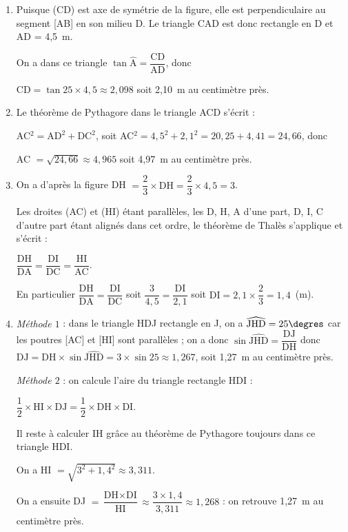 \begin{enumerate}
\item %
Puisque (CD) est axe de symétrie de la figure, elle est perpendiculaire au segment [AB] en son milieu D. Le triangle CAD est donc rectangle en D et AD = 4,5~m.

On a dans ce triangle $\tan \widehat{\text{A}} = \dfrac{\text{CD}}{\text{AD}}$, donc

$\text{CD} = \tan 25 \times 4,5 \approx 2,098$ soit 2,10~m au centimètre près.
\item %
Le théorème de Pythagore dans le triangle ACD s'écrit :

AC$^2 = \text{AD}^2 + \text{DC}^2$, soit AC$^2 = 4,5^2 + 2,1^2 = 20,25 + 4,41 = 24,66$, donc

AC $= \sqrt{24,66} \approx 4,965$ soit 4,97~m au centimètre près.
\item %

On a d'après la figure DH $ = \dfrac{2}{3} \times \text{DH} = \dfrac{2}{3} \times 4,5 = 3$.

Les droites (AC) et (HI) étant parallèles, les D, H, A d'une part, D, I, C d'autre part étant alignés dans cet ordre, le théorème de Thalès s'applique et s'écrit :

$\dfrac{\text{DH}}{\text{DA}}  = \dfrac{\text{DI}}{\text{DC}} = \dfrac{\text{HI}}{\text{AC}}$.

En particulier $\dfrac{\text{DH}}{\text{DA}}  = \dfrac{\text{DI}}{\text{DC}}$ soit $\dfrac{3}{4,5} = \dfrac{\text{DI}}{2,1}$ soit $\text{DI} = 2,1 \times \dfrac{2}{3} = 1,4$~(m).
\item %
\emph{Méthode $1$} : dans le triangle HDJ rectangle en J, on a $\widehat{\text{JHD}} = 25\degres$ car les poutres [AC] et [HI] sont parallèles ; on a donc $\sin \widehat{\text{JHD}} = \dfrac{\text{DJ}}{\text{DH}}$ donc $\text{DJ} = \text{DH} \times \sin \widehat{\text{JHD}} = 3 \times \sin 25 \approx 1,267$, soit 1,27~m au centimètre près.

\emph{Méthode $2$} : on calcule l'aire du triangle rectangle HDI :

$\dfrac{1}{2} \times \text{HI} \times \text{DJ} = \dfrac{1}{2} \times \text{DH} \times \text{DI}$.

Il reste à calculer IH grâce au théorème de Pythagore toujours dans ce triangle HDI.

On a HI $= \sqrt{3^2 + 1,4^2} \approx 3,311$.

On a ensuite  DJ $ = \dfrac{\text{DH} \times \text{DI}}{\text{HI}} \approx \dfrac{3 \times 1,4}{3,311} \approx 1,268$ : on retrouve 1,27~m au centimètre près.
\end{enumerate}
\vspace{0.25cm}

